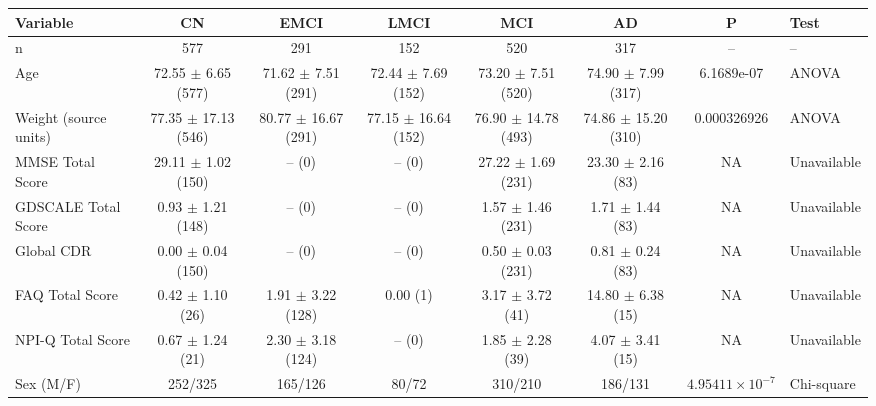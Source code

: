 \begin{tabular}{lccccccl}
\hline
Variable & CN & EMCI & LMCI & MCI & AD & P & Test \\
\hline
n & 577 & 291 & 152 & 520 & 317 & -- & -- \\
Age & 72.55 $\pm$ 6.65 (577) & 71.62 $\pm$ 7.51 (291) & 72.44 $\pm$ 7.69 (152) & 73.20 $\pm$ 7.51 (520) & 74.90 $\pm$ 7.99 (317) & 6.1689e-07 & ANOVA \\
Weight (source units) & 77.35 $\pm$ 17.13 (546) & 80.77 $\pm$ 16.67 (291) & 77.15 $\pm$ 16.64 (152) & 76.90 $\pm$ 14.78 (493) & 74.86 $\pm$ 15.20 (310) & 0.000326926 & ANOVA \\
MMSE Total Score & 29.11 $\pm$ 1.02 (150) & -- (0) & -- (0) & 27.22 $\pm$ 1.69 (231) & 23.30 $\pm$ 2.16 (83) & NA & Unavailable \\
GDSCALE Total Score & 0.93 $\pm$ 1.21 (148) & -- (0) & -- (0) & 1.57 $\pm$ 1.46 (231) & 1.71 $\pm$ 1.44 (83) & NA & Unavailable \\
Global CDR & 0.00 $\pm$ 0.04 (150) & -- (0) & -- (0) & 0.50 $\pm$ 0.03 (231) & 0.81 $\pm$ 0.24 (83) & NA & Unavailable \\
FAQ Total Score & 0.42 $\pm$ 1.10 (26) & 1.91 $\pm$ 3.22 (128) & 0.00 (1) & 3.17 $\pm$ 3.72 (41) & 14.80 $\pm$ 6.38 (15) & NA & Unavailable \\
NPI-Q Total Score & 0.67 $\pm$ 1.24 (21) & 2.30 $\pm$ 3.18 (124) & -- (0) & 1.85 $\pm$ 2.28 (39) & 4.07 $\pm$ 3.41 (15) & NA & Unavailable \\
Sex (M/F) & 252/325 & 165/126 & 80/72 & 310/210 & 186/131 & $4.95411\times10^{-7}$ & Chi-square \\
\hline
\end{tabular}
